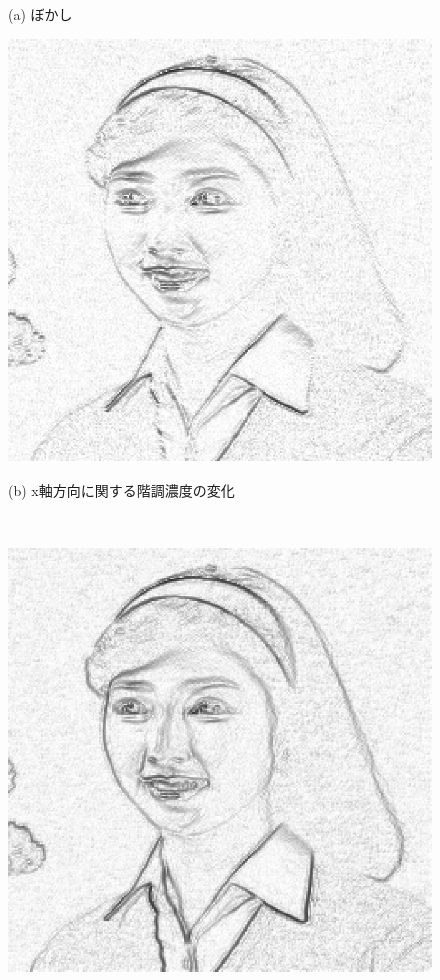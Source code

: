 \begin{figure}[H]
\begin{center}
\begin{minipage}{.38\textwidth}
\begin{center}
(a) ぼかし
\end{center}
\end{minipage}
\begin{minipage}{.38\textwidth}
\begin{center}
\includegraphics[width=.98\textwidth]{fig/hair1_x_sharp.eps}

(b) x軸方向に関する階調濃度の変化
\end{center}
\end{minipage}\\[.5\baselineskip]
\begin{minipage}{.38\textwidth}
\begin{center}
\includegraphics[width=.98\textwidth]{fig/hair1_rinkaku.eps}


\end{center}
\end{minipage}
\end{center}
\end{figure}
